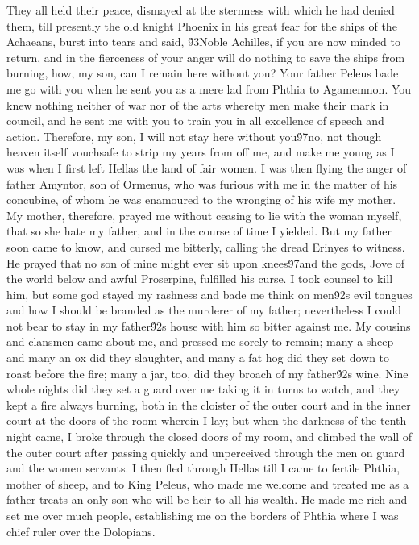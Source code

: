 {They all held their peace, dismayed at the sternness with which he had denied them, till presently the old knight Phoenix in his great fear for the ships of the Achaeans, burst into tears and said, \'93Noble Achilles, if you are now minded to return, and in the fierceness of your anger will do nothing to save the ships from burning, how, my son, can I remain here without you? Your father Peleus bade me go with you when he sent you as a mere lad from Phthia to Agamemnon. You knew nothing neither of war nor of the arts whereby men make their mark in council, and he sent me with you to train you in all excellence of speech and action. Therefore, my son, I will not stay here without you\'97no, not though heaven itself vouchsafe to strip my years from off me, and make me young as I was when I first left Hellas the land of fair women. I was then flying the anger of father Amyntor, son of Ormenus, who was furious with me in the matter of his concubine, of whom he was enamoured to the wronging of his wife my mother. My mother, therefore, prayed me without ceasing to lie with the woman myself, that so she hate my father, and in the course of time I yielded. But my father soon came to know, and cursed me bitterly, calling the dread Erinyes to witness. He prayed that no son of mine might ever sit upon knees\'97and the gods, Jove of the world below and awful Proserpine, fulfilled his curse. I took counsel to kill him, but some god stayed my rashness and bade me think on men\'92s evil tongues and how I should be branded as the murderer of my father; nevertheless I could not bear to stay in my father\'92s house with him so bitter against me. My cousins and clansmen came about me, and pressed me sorely to remain; many a sheep and many an ox did they slaughter, and many a fat hog did they set down to roast before the fire; many a jar, too, did they broach of my father\'92s wine. Nine whole nights did they set a guard over me taking it in turns to watch, and they kept a fire always burning, both in the cloister of the outer court and in the inner court at the doors of the room wherein I lay; but when the darkness of the tenth night came, I broke through the closed doors of my room, and climbed the wall of the outer court after passing quickly and unperceived through the men on guard and the women servants. I then fled through Hellas till I came to fertile Phthia, mother of sheep, and to King Peleus, who made me welcome and treated me as a father treats an only son who will be heir to all his wealth. He made me rich and set me over much people, establishing me on the borders of Phthia where I was chief ruler over the Dolopians.\
}
